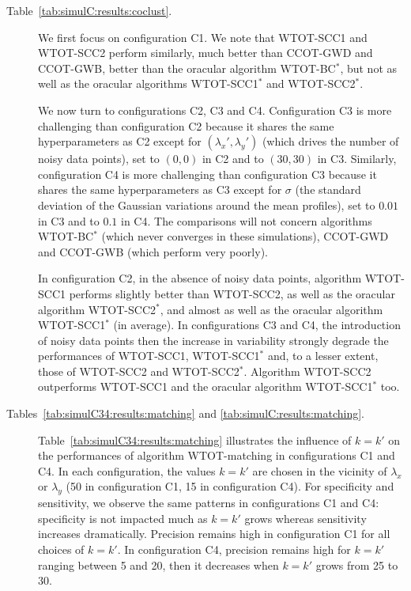 \begin{description}
\item[Table~\ref{tab:simulC:results:coclust}.]     We     first    focus    on
  configuration C1.  We  note that WTOT-SCC1 and  WTOT-SCC2 perform similarly,
  much better than  CCOT-GWD and CCOT-GWB, better than  the oracular algorithm
  WTOT-BC$^*$, but  not as well  as the oracular algorithms  WTOT-SCC1$^*$ and
  WTOT-SCC2$^*$.

  We  now turn  to configurations  C2,  C3 and  C4. Configuration  C3 is  more
  challenging than configuration C2 because it shares the same hyperparameters
  as C2 except  for $(\lambda_{x}',\lambda_{y}')$ (which drives  the number of
  noisy data points), set to $(0,0)$ in  C2 and to $(30,30)$ in C3. Similarly,
  configuration C4 is more challenging than configuration C3 because it shares
  the same hyperparameters  as C3 except for $\sigma$  (the standard deviation
  of the  Gaussian variations around the  mean profiles), set to  $0.01$ in C3
  and to $0.1$ in C4. The  comparisons will not concern algorithms WTOT-BC$^*$
  (which never converges  in these simulations), CCOT-GWD  and CCOT-GWB (which
  perform very poorly).

  In  configuration  C2,  in  the  absence of  noisy  data  points,  algorithm
  WTOT-SCC1 performs slightly  better than WTOT-SCC2, as well  as the oracular
  algorithm  WTOT-SCC2$^*$,  and almost  as  well  as the  oracular  algorithm
  WTOT-SCC1$^*$ (in average).   In configurations C3 and  C4, the introduction
  of noisy data  points then the increase in variability  strongly degrade the
  performances of WTOT-SCC1,  WTOT-SCC1$^*$ and, to a lesser  extent, those of
  WTOT-SCC2 and WTOT-SCC2$^*$.  Algorithm  WTOT-SCC2 outperforms WTOT-SCC1 and
  the oracular algorithm WTOT-SCC1$^*$ too.
  
\item[Tables~\ref{tab:simulC34:results:matching}                           and
  \ref{tab:simulC:results:matching}.]
  Table~\ref{tab:simulC34:results:matching}   illustrates  the   influence  of
  $k=k'$ on the  performances of algorithm WTOT-matching  in configurations C1
  and C4. In each configuration, the  values $k=k'$ are chosen in the vicinity
  of $\lambda_x$ or  $\lambda_y$ (50 in configuration C1,  15 in configuration
  C4).   For specificity  and sensitivity,  we  observe the  same patterns  in
  configurations C1 and  C4: specificity is not impacted much  as $k=k'$ grows
  whereas  sensitivity  increases  dramatically.  Precision  remains  high  in
  configuration C1 for  all choices of $k=k'$. In  configuration C4, precision
  remains high  for $k=k'$ ranging  between 5 and  20, then it  decreases when
  $k=k'$ grows from 25 to 30.
  

\end{description}
